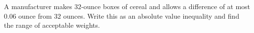 A manufacturer makes $32$-ounce boxes of cereal and allows a difference of at most $0.06$ ounce from $32$ ounces. Write this as an absolute value inequality and find the range of acceptable weights.
